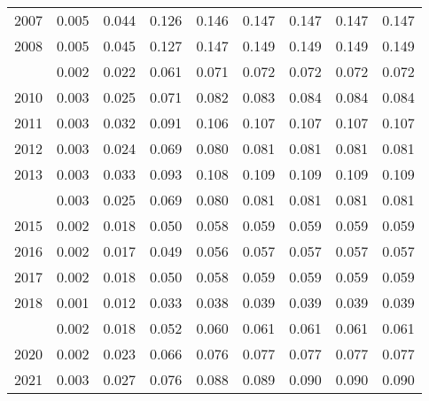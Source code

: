 \documentclass[
]{article}
\begin{document}
\begin{longtable}[t]{lrrrrrrrr}
2007 & 0.005 & 0.044 & 0.126 & 0.146 & 0.147 & 0.147 & 0.147 & 0.147\\
2008 & 0.005 & 0.045 & 0.127 & 0.147 & 0.149 & 0.149 & 0.149 & 0.149\\
\addlinespace
2009 & 0.002 & 0.022 & 0.061 & 0.071 & 0.072 & 0.072 & 0.072 & 0.072\\
2010 & 0.003 & 0.025 & 0.071 & 0.082 & 0.083 & 0.084 & 0.084 & 0.084\\
2011 & 0.003 & 0.032 & 0.091 & 0.106 & 0.107 & 0.107 & 0.107 & 0.107\\
2012 & 0.003 & 0.024 & 0.069 & 0.080 & 0.081 & 0.081 & 0.081 & 0.081\\
2013 & 0.003 & 0.033 & 0.093 & 0.108 & 0.109 & 0.109 & 0.109 & 0.109\\
\addlinespace
2014 & 0.003 & 0.025 & 0.069 & 0.080 & 0.081 & 0.081 & 0.081 & 0.081\\
2015 & 0.002 & 0.018 & 0.050 & 0.058 & 0.059 & 0.059 & 0.059 & 0.059\\
2016 & 0.002 & 0.017 & 0.049 & 0.056 & 0.057 & 0.057 & 0.057 & 0.057\\
2017 & 0.002 & 0.018 & 0.050 & 0.058 & 0.059 & 0.059 & 0.059 & 0.059\\
2018 & 0.001 & 0.012 & 0.033 & 0.038 & 0.039 & 0.039 & 0.039 & 0.039\\
\addlinespace
2019 & 0.002 & 0.018 & 0.052 & 0.060 & 0.061 & 0.061 & 0.061 & 0.061\\
2020 & 0.002 & 0.023 & 0.066 & 0.076 & 0.077 & 0.077 & 0.077 & 0.077\\
2021 & 0.003 & 0.027 & 0.076 & 0.088 & 0.089 & 0.090 & 0.090 & 0.090\\*
\end{longtable}
\end{document}
